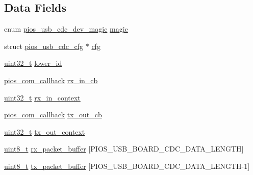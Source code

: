 \subsection*{Data Fields}
\begin{DoxyCompactItemize}
\item 
enum \hyperlink{group___p_i_o_s___u_s_b___c_o_m_gab4c476b0e464c59dcf6eadec015a87b8}{pios\-\_\-usb\-\_\-cdc\-\_\-dev\-\_\-magic} \hyperlink{group___p_i_o_s___u_s_b___c_o_m_gaf1f80b904c24c3a9d91aa7c8d9f0e0f7}{magic}
\item 
struct \hyperlink{structpios__usb__cdc__cfg}{pios\-\_\-usb\-\_\-cdc\-\_\-cfg} $\ast$ \hyperlink{group___p_i_o_s___u_s_b___c_o_m_gac129f3ba21ca6cb9ff92da45033acbbb}{cfg}
\item 
\hyperlink{stdint_8h_a435d1572bf3f880d55459d9805097f62}{uint32\-\_\-t} \hyperlink{group___p_i_o_s___u_s_b___c_o_m_ga5431d5544be717a197964da5a3b08d2a}{lower\-\_\-id}
\item 
\hyperlink{group___p_i_o_s___c_o_m_ga23f1888821f1f74a50c02adc459df597}{pios\-\_\-com\-\_\-callback} \hyperlink{group___p_i_o_s___u_s_b___c_o_m_gaf3cf777f785d8b2a117c736064e859de}{rx\-\_\-in\-\_\-cb}
\item 
\hyperlink{stdint_8h_a435d1572bf3f880d55459d9805097f62}{uint32\-\_\-t} \hyperlink{group___p_i_o_s___u_s_b___c_o_m_gae98fcbb800c5655c05106c1e73a1de01}{rx\-\_\-in\-\_\-context}
\item 
\hyperlink{group___p_i_o_s___c_o_m_ga23f1888821f1f74a50c02adc459df597}{pios\-\_\-com\-\_\-callback} \hyperlink{group___p_i_o_s___u_s_b___c_o_m_ga1e9a79d782c5671d5e35aafe776632f3}{tx\-\_\-out\-\_\-cb}
\item 
\hyperlink{stdint_8h_a435d1572bf3f880d55459d9805097f62}{uint32\-\_\-t} \hyperlink{group___p_i_o_s___u_s_b___c_o_m_ga81d00c55fe107bb853a8629706b0acb4}{tx\-\_\-out\-\_\-context}
\item 
\hyperlink{stdint_8h_aba7bc1797add20fe3efdf37ced1182c5}{uint8\-\_\-t} \hyperlink{group___p_i_o_s___u_s_b___c_o_m_ga82f6a571f9bf92fae2d7368be2407a27}{rx\-\_\-packet\-\_\-buffer} \mbox{[}P\-I\-O\-S\-\_\-\-U\-S\-B\-\_\-\-B\-O\-A\-R\-D\-\_\-\-C\-D\-C\-\_\-\-D\-A\-T\-A\-\_\-\-L\-E\-N\-G\-T\-H\mbox{]}
\item 
\hyperlink{stdint_8h_aba7bc1797add20fe3efdf37ced1182c5}{uint8\-\_\-t} \hyperlink{group___p_i_o_s___u_s_b___c_o_m_ga1b086465e042517001948516cfa908d1}{tx\-\_\-packet\-\_\-buffer} \mbox{[}P\-I\-O\-S\-\_\-\-U\-S\-B\-\_\-\-B\-O\-A\-R\-D\-\_\-\-C\-D\-C\-\_\-\-D\-A\-T\-A\-\_\-\-L\-E\-N\-G\-T\-H-\/1\mbox{]}
\item 

\end{DoxyCompactItemize}
